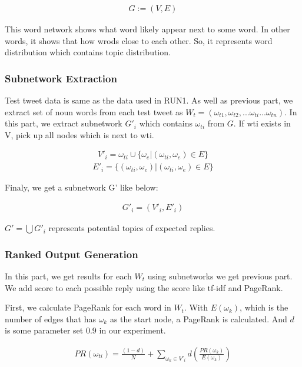 \documentclass{../style/sig-alternate}
\begin{document}
\begin{eqnarray}
G := (V,E)
\end{eqnarray}

This word network shows what word likely appear next to some word. In other words, it shows that how wrods close to each other. So, it represents word distribution which contains topic distribution.

\subsubsection{Subnetwork Extraction}
Test tweet data is same as the data used in RUN1. As well as previous part, we extract set of noun words from each test tweet as \(W_{t} = (\omega_{t1}, \omega_{t2}, ... \omega_{ti} ... \omega_{tn})\).
In this part, we extract subnetwork $G'_{i}$ which contains \(\omega_{ti}\) from $G$.
If wti exists in V, pick up all nodes which is next to wti.

\begin{eqnarray}V'_{i} = \omega_{ti} \cup \{\omega_{e} |  (\omega_{ti}, \omega_{e}) \in E\}\end{eqnarray}
\begin{eqnarray}E'_{i} = \{(\omega_{ti}, \omega_{e}) | (\omega_{ti}, \omega_{e}) \in E\} \end{eqnarray}

Finaly, we get a subnetwork G' like below:

\begin{eqnarray}G'_{i} = (V'_{i}, E'_{i})\end{eqnarray}

\(G' = \bigcup G'_{i}\) represents potential topics of expected replies.

\subsubsection{Ranked Output Generation}
In this part, we get results for each $W_{t}$ using subnetworks we get previous part. We add score to each possible reply using the score like tf-idf and PageRank\cite{PageRank}.

First, we calculate PageRank for each word in $W_{t}$. With $E(\omega_{k})$, which is the number of edges that has $\omega_{k}$ as the start node, a PageRank is calculated. And $d$ is some parameter set $0.9$ in our experiment.

\begin{eqnarray}PR(\omega_{ti}) = \frac{(1-d)}{N} + \sum_{\omega_{k}\in V'_{i}} d(\frac{PR(\omega_{k})}{E(\omega_{k})})\end{eqnarray}
\end{document}
